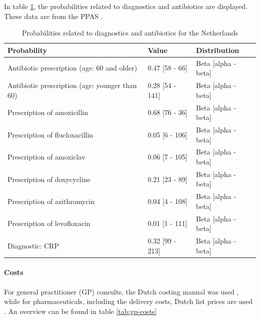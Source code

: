 \documentclass[
]{article}
\begin{document}
In table \ref{tab:probabilities-ppas}, the probabilities related to diagnostics and antibiotics are displayed. These data are from the PPAS \autocite{veldenPrimaryCarePatients2021}.

\begin{table}

\caption{\label{tab:probabilities-ppas}Probabilities related to diagnostics and antibiotics for the Netherlands}
\centering
\begin{tabular}[t]{l|l|l}
\hline
Probability & Value & Distribution\\
\hline
Antibiotic prescription (age: 60 and older) & 0.47 [58 - 66] & Beta [alpha - beta]\\
\hline
Antibiotic prescription (age: younger than 60) & 0.28 [54 - 141] & Beta [alpha - beta]\\
\hline
Prescription of amoxicillin & 0.68 [76 - 36] & Beta [alpha - beta]\\
\hline
Prescription of flucloxacillin & 0.05 [6 - 106] & Beta [alpha - beta]\\
\hline
Prescription of amoxiclav & 0.06 [7 - 105] & Beta [alpha - beta]\\
\hline
Prescription of doxycycline & 0.21 [23 - 89] & Beta [alpha - beta]\\
\hline
Prescription of azithromycin & 0.04 [4 - 108] & Beta [alpha - beta]\\
\hline
Prescription of levofloxacin & 0.01 [1 - 111] & Beta [alpha - beta]\\
\hline
Diagnostic: CRP & 0.32 [99 - 213] & Beta [alpha - beta]\\
\hline
\end{tabular}
\end{table}

\hypertarget{costs}{%
\paragraph{Costs}\label{costs}}

For general practitioner (GP) consults, the Dutch costing manual was used \autocite{hakkaart-vanroijenKostenhandleidingMethodologieVan2015}, while for pharmaceuticals, including the delivery costs, Dutch list prices are used \autocite{zorginstituutnederlandMedicijnkosten}. An overview can be found in table \ref{tab:gp-costs}
\end{document}
